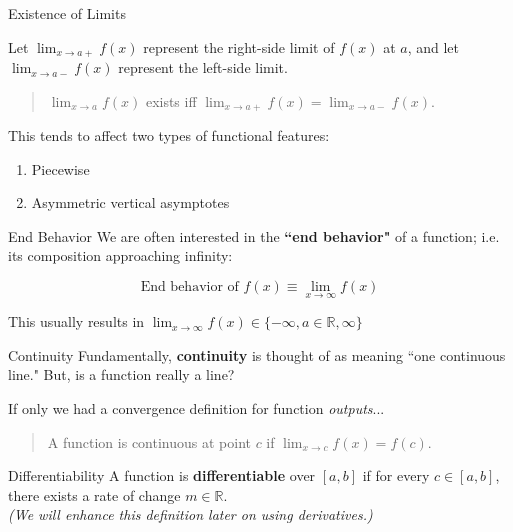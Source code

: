 \documentclass[10pt]{beamer}
\begin{document}
\begin{frame}{Existence of Limits}

Let $\lim_{x \to a +} f(x)$ represent the right-side limit of $f(x)$ at $a$, and let $\lim_{x \to a-} f(x)$ represent the left-side limit. \\


\vspace{1.5cm}

\begin{quote}
    $\lim_{x \to a} f(x)$ exists iff  $\lim_{x \to a +} f(x) = \lim_{x \to a-} f(x)$.
\end{quote}

\vspace{.5cm}
This tends to affect two types of functional features:

\begin{enumerate}
    \item Piecewise
    \item Asymmetric vertical asymptotes
\end{enumerate}

\end{frame}

\begin{frame}{End Behavior}
    We are often interested in the \textbf{``end behavior"} of a function; i.e. its composition approaching infinity:

    \[\text{End behavior of } f(x) \equiv \lim_{x \to \infty} f(x)\]

    This usually results in $\lim_{x\to\infty}f(x) \in \{-\infty, a \in \mathbb{R}, \infty\}$
\end{frame}

\begin{frame}{Continuity}
Fundamentally, \textbf{continuity} is thought of as meaning ``one continuous line." But, is a function really a line? \\

\vspace{.5cm}

If only we had a convergence definition for function \textit{outputs}... \pause

\vspace{1cm}

\begin{quote}
    A function is continuous at point $c$ if $\lim_{x \to c} f(x) = f(c)$.
\end{quote}
\end{frame}


\begin{frame}{Differentiability}
    A function is \textbf{differentiable} over $[a,b]$ if for every $c \in [a,b]$, there exists a rate of change $m \in \mathbb{R}$. \\
\vspace{.5cm}
    \textit{(We will enhance this definition later on using derivatives.)}
\end{frame}
\end{document}
